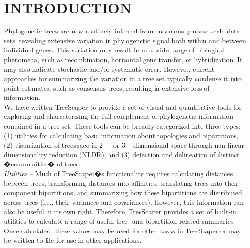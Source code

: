 \documentclass[11pt]{article}
\begin{document}
\begin{center}\tableofcontents\end{center}
\newpage

\section{INTRODUCTION}\label{sect:Introduction}

Phylogenetic trees are now routinely inferred from enormous genome-scale data sets, revealing extensive variation in phylogenetic signal both within and between individual genes. This variation may result from a wide range of biological phenomena, such as recombination, horizontal gene transfer, or hybridization.  It may also indicate stochastic and/or systematic error.  However, current approaches for summarizing the variation in a tree set typically condense it into point estimates, such as consensus trees, resulting in extensive loss of information. \\


We have written TreeScaper to provide a set of visual and quantitative tools for exploring and characterizing the full complement of phylogenetic information contained in a tree set. These tools can be broadly categorized into three types: (1) utilities for calculating basic information about topologies and bipartitions, (2) visualization of treespace in $2-$ or $3-$dimensional space through non-linear dimensionality reduction (NLDR), and (3) detection and delineation of distinct �communities� of trees. \\


{\it Utilities} -- Much of TreeScaper�s functionality requires calculating distances between trees, transforming distances into affinities, translating trees into their component bipartitions, and summarizing how these bipartitions are distributed across trees (i.e., their variances and covariances). However, this information can also be useful in its own right. Therefore, TreeScaper provides a set of built-in utilities to calculate a range of useful tree- and bipartition-related summaries. Once calculated, these values may be used for other tasks in TreeScaper or may be written to file for use in other applications. \\
\end{document}
